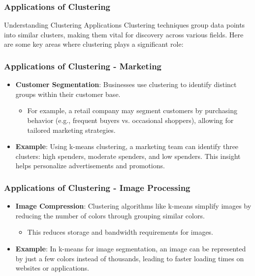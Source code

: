 \documentclass{beamer}
\begin{document}
\begin{frame}[fragile]
    \frametitle{Applications of Clustering}
    \begin{block}{Understanding Clustering Applications}
        Clustering techniques group data points into similar clusters, making them vital for discovery across various fields. Here are some key areas where clustering plays a significant role:
    \end{block}
\end{frame}

\begin{frame}[fragile]
    \frametitle{Applications of Clustering - Marketing}
    \begin{itemize}
        \item \textbf{Customer Segmentation}: Businesses use clustering to identify distinct groups within their customer base.
        \begin{itemize}
            \item For example, a retail company may segment customers by purchasing behavior (e.g., frequent buyers vs. occasional shoppers), allowing for tailored marketing strategies.
        \end{itemize}
        \item \textbf{Example}: Using k-means clustering, a marketing team can identify three clusters: high spenders, moderate spenders, and low spenders. This insight helps personalize advertisements and promotions.
    \end{itemize}
\end{frame}

\begin{frame}[fragile]
    \frametitle{Applications of Clustering - Image Processing}
    \begin{itemize}
        \item \textbf{Image Compression}: Clustering algorithms like k-means simplify images by reducing the number of colors through grouping similar colors.
        \begin{itemize}
            \item This reduces storage and bandwidth requirements for images.
        \end{itemize}
        \item \textbf{Example}: In k-means for image segmentation, an image can be represented by just a few colors instead of thousands, leading to faster loading times on websites or applications.
    \end{itemize}
\end{frame}
\end{document}
